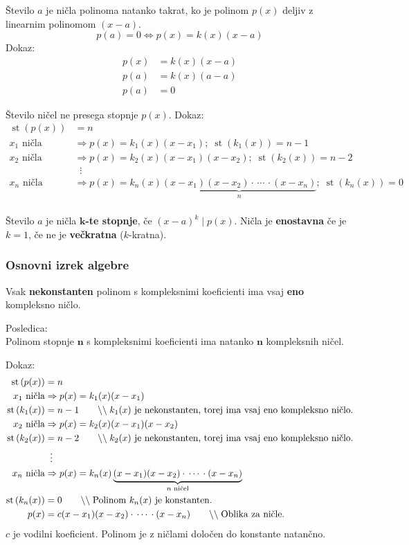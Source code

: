 \documentclass[a4paper,oneside,12pt,fleqn]{article}
\newcommand\krat\cdot
\newcommand{\comment}[1]{\ensuremath{\qquad\backslash\backslash\;}\textnormal{#1}}
\newcommand{\st}{\ensuremath{\operatorname{st}}} %
\renewcommand\implies\Rightarrow
\renewcommand\iff\Leftrightarrow
\numberwithin{equation}{section}
\begin{document}
Število $a$ je ničla polinoma natanko takrat, ko je polinom $p(x)$ deljiv z linearnim
polinomom $(x-a)$.
\[ p(a) = 0 \iff p(x) = k(x)(x-a) \]
Dokaz:
\begin{align*}
  p(x) &= k(x)(x-a) \\
  p(a) &= k(x)(a-a) \\
  p(a) &= 0
\end{align*}

Število ničel ne presega stopnje $p(x)$. Dokaz:
\begin{align*}
  \st\left( p(x) \right) &= n \\
  x_1 \text{ ničla} &\implies p(x) = k_1(x)(x-x_1); \; \st\left( k_1(x) \right) = n-1 \\
  x_2 \text{ ničla} &\implies p(x) = k_2(x)(x-x_1)(x-x_2); \; \st\left( k_2(x) \right) = n-2 \\
  & \;\; \vdots \\
  x_n \text{ ničla} &\implies p(x) =
  k_n(x)\underbrace{(x-x_1)(x-x_2)\krat\,\cdots\,\krat(x-x_n)}_{n}; \; \st\left( k_n(x) \right) = 0 \\
\end{align*}

Število $a$ je ničla \textbf{$\boldsymbol k$-te stopnje}, če $(x-a)^k\;|\;p(x)$. Ničla je
\textbf{enostavna} če je $k = 1$, če ne je \textbf{večkratna} ($k$-kratna).

\subsubsection{Osnovni izrek algebre}
\label{sec:pol:nic:osnalg}
Vsak \textbf{nekonstanten} polinom s kompleksnimi koeficienti ima vsaj \textbf{eno} kompleksno ničlo.

Posledica:\\
Polinom stopnje $\boldsymbol n$ s kompleksnimi koeficienti ima natanko $\boldsymbol n$ kompleksnih ničel.

Dokaz:
\begin{align*}
  \st\left( p(x) \right) &= n \\
  x_1 \text{ ničla} &\implies p(x) = k_1(x)(x-x_1) \\
  \st\left( k_1(x) \right) &= n-1 \comment{$k_1(x)$ je nekonstanten, torej ima
  vsaj eno kompleksno ničlo.} \\
  x_2 \text{ ničla} &\implies p(x) = k_2(x)(x-x_1)(x-x_2) \\
  \st\left( k_2(x) \right) &= n-2 \comment{$k_2(x)$ je nekonstanten, torej ima
  vsaj eno kompleksno ničlo.} \\
  & \;\; \vdots \\
  x_n \text{ ničla} &\implies p(x) =
  k_n(x)\underbrace{(x-x_1)(x-x_2)\krat\,\cdots\,\krat(x-x_n)}_{n \text{ ničel}} \\
  \st\left( k_n(x) \right) &= 0 \comment{Polinom $k_n(x)$ je konstanten.} \\
  p(x) &= c(x-x_1)(x-x_2)\krat\,\cdots\,\krat(x-x_n) \comment{Oblika za ničle.}
\end{align*}
$c$ je vodilni koeficient. Polinom je z ničlami določen do konstante natančno.
\end{document}
